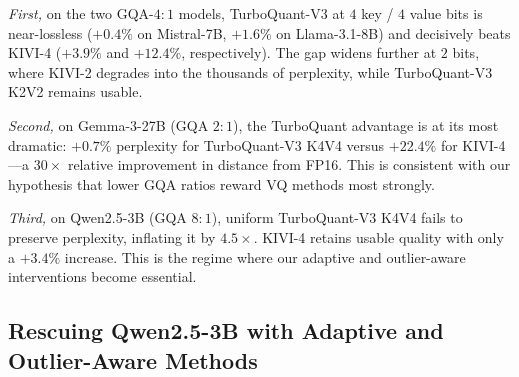 \documentclass[11pt]{article}
\begin{document}
\emph{First,} on the two GQA-$4{:}1$ models, TurboQuant-V3 at $4$ key / $4$ value bits is near-lossless ($+0.4\%$ on Mistral-7B, $+1.6\%$ on Llama-3.1-8B) and decisively beats KIVI-4 ($+3.9\%$ and $+12.4\%$, respectively). The gap widens further at $2$ bits, where KIVI-2 degrades into the thousands of perplexity, while TurboQuant-V3 K2V2 remains usable.

\emph{Second,} on Gemma-3-27B (GQA $2{:}1$), the TurboQuant advantage is at its most dramatic: $+0.7\%$ perplexity for TurboQuant-V3 K4V4 versus $+22.4\%$ for KIVI-4---a $30\times$ relative improvement in distance from FP16. This is consistent with our hypothesis that lower GQA ratios reward VQ methods most strongly.

\emph{Third,} on Qwen2.5-3B (GQA $8{:}1$), uniform TurboQuant-V3 K4V4 fails to preserve perplexity, inflating it by $4.5\times$. KIVI-4 retains usable quality with only a $+3.4\%$ increase. This is the regime where our adaptive and outlier-aware interventions become essential.

\subsection{Rescuing Qwen2.5-3B with Adaptive and Outlier-Aware Methods}
\label{sec:qwen-rescue}
\end{document}
